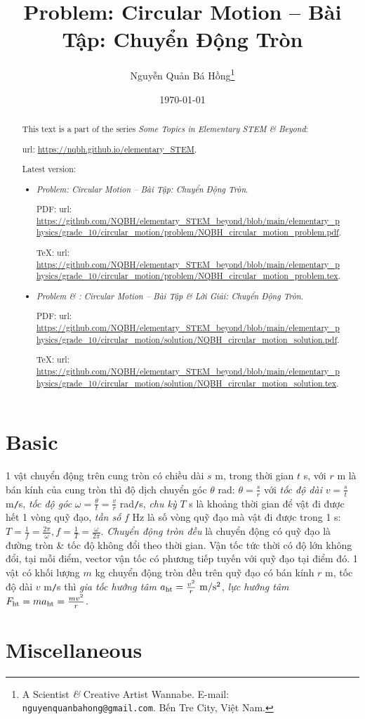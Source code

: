 \documentclass{article}
\title{Problem: Circular Motion -- Bài Tập: Chuyển Động Tròn}
\author{Nguyễn Quản Bá Hồng\footnote{A Scientist {\it\&} Creative Artist Wannabe. E-mail: {\tt nguyenquanbahong@gmail.com}. Bến Tre City, Việt Nam.}}
\date{\today}
\begin{document}
\maketitle
\begin{abstract}
	This text is a part of the series {\it Some Topics in Elementary STEM \& Beyond}:
	
	{\sc url}: \url{https://nqbh.github.io/elementary_STEM}.
	
	Latest version:
	\begin{itemize}
		\item {\it Problem: Circular Motion -- Bài Tập: Chuyển Động Tròn}.
		
		PDF: {\sc url}: \url{https://github.com/NQBH/elementary_STEM_beyond/blob/main/elementary_physics/grade_10/circular_motion/problem/NQBH_circular_motion_problem.pdf}.
		
		\TeX: {\sc url}: \url{https://github.com/NQBH/elementary_STEM_beyond/blob/main/elementary_physics/grade_10/circular_motion/problem/NQBH_circular_motion_problem.tex}.
		\item {\it Problem \& : Circular Motion -- Bài Tập \& Lời Giải: Chuyển Động Tròn}.
		
		PDF: {\sc url}: \url{https://github.com/NQBH/elementary_STEM_beyond/blob/main/elementary_physics/grade_10/circular_motion/solution/NQBH_circular_motion_solution.pdf}.
		
		\TeX: {\sc url}: \url{https://github.com/NQBH/elementary_STEM_beyond/blob/main/elementary_physics/grade_10/circular_motion/solution/NQBH_circular_motion_solution.tex}.
	\end{itemize}
\end{abstract}
\tableofcontents


\section{Basic}
 1 vật chuyển động trên cung tròn có chiều dài $s$ m, trong thời gian $t$ s, với $r$ m là bán kính của cung tròn thì độ dịch chuyển góc $\theta$ rad: $\theta = \frac{s}{r}$ với {\it tốc độ dài} $v = \frac{s}{t}$ m{\tt/}s, {\it tốc độ góc} $\omega = \frac{\theta}{t} = \frac{v}{r}$ rad{\tt/}s, {\it chu kỳ} $T$ s là khoảng thời gian để vật đi được hết 1 vòng quỹ đạo, {\it tần số} $f$ Hz là số vòng quỹ đạo mà vật đi được trong 1 s: $T = \frac{1}{f} = \frac{2\pi}{\omega},f = \frac{1}{T}  =\frac{\omega}{2\pi}$.  {\it Chuyển động tròn đều} là chuyển động có quỹ đạo là đường tròn \& tốc độ không đổi theo thời gian. Vận tốc tức thời có độ lớn không đổi, tại mỗi điểm, vector vận tốc có phương tiếp tuyến với quỹ đạo tại điểm đó.  1 vật có khối lượng $m$ kg chuyển động tròn đều trên quỹ đạo có bán kính $r$ m, tốc độ dài $v$ m{\tt/}s thì {\it gia tốc hướng tâm} $a_{\rm ht} = \frac{v^2}{r}\ {\rm m{\tt/}s^2}$, {\it lực hướng tâm} $F_{\rm ht} = ma_{\rm ht} = \frac{mv^2}{r}$.


\section{Miscellaneous}


\printbibliography[heading=bibintoc]
	
\end{document}
